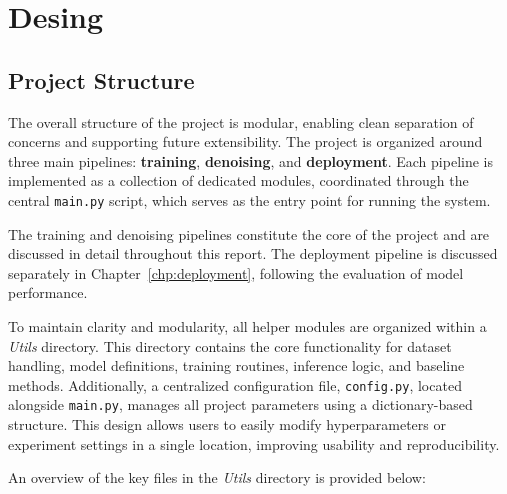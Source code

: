 \graphicspath{{content/chapters/5_design/figures/}}
\chapter{Desing}
\label{chp:design}

\section{Project Structure}
\label{sec:project_structure}

The overall structure of the project is modular, enabling clean separation of concerns and supporting future extensibility. The project is organized around three main pipelines: \textbf{training}, \textbf{denoising}, and \textbf{deployment}. Each pipeline is implemented as a collection of dedicated modules, coordinated through the central \texttt{main.py} script, which serves as the entry point for running the system.

The training and denoising pipelines constitute the core of the project and are discussed in detail throughout this report. The deployment pipeline is discussed separately in Chapter~\ref{chp:deployment}, following the evaluation of model performance.

To maintain clarity and modularity, all helper modules are organized within a \textit{Utils} directory. This directory contains the core functionality for dataset handling, model definitions, training routines, inference logic, and baseline methods. Additionally, a centralized configuration file, \texttt{config.py}, located alongside \texttt{main.py}, manages all project parameters using a dictionary-based structure. This design allows users to easily modify hyperparameters or experiment settings in a single location, improving usability and reproducibility.

An overview of the key files in the \textit{Utils} directory is provided below:

